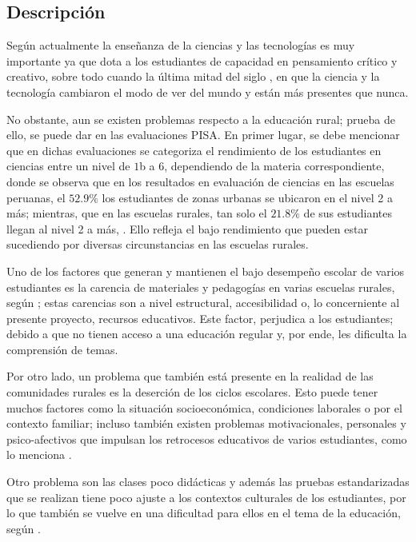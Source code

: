\subsection{Descripción}

\setcounter{siglo}{20}

Según \cite[p.~140-143]{elaner_antonio_arrieta_vega_2024_13517936} actualmente la enseñanza de la ciencias y las tecnologías es muy importante ya que dota a los estudiantes de capacidad en pensamiento crítico y creativo, sobre todo cuando la última mitad del siglo , en que la ciencia y la tecnología cambiaron el modo de ver del mundo y están más presentes que nunca.

No obstante, aun se existen problemas respecto a la educación rural; prueba de ello, se puede dar en las evaluaciones PISA. En primer lugar, se debe mencionar que en dichas evaluaciones se categoriza el rendimiento de los estudiantes en ciencias entre un nivel de $1$b a $6$, dependiendo de la materia correspondiente, donde se observa que en los resultados en evaluación de ciencias en las escuelas peruanas, el $52.9\%$ los estudiantes de zonas urbanas se ubicaron en el nivel 2 a más; mientras, que en las escuelas rurales, tan solo el $21.8\%$ de sus estudiantes llegan al nivel 2 a más, \cite[p.~32]{umcPISA2022presentation}. Ello refleja el bajo rendimiento que pueden estar sucediendo por diversas circunstancias en las escuelas rurales.

Uno de los factores que generan y mantienen el bajo desempeño escolar de varios estudiantes es la carencia de materiales y pedagogías en varias escuelas rurales, según \cite[p.~136]{montes2023participacion}; estas carencias son a nivel estructural, accesibilidad o, lo concerniente al presente proyecto, recursos educativos. Este factor, perjudica a los estudiantes; debido a que no tienen acceso a una educación regular y, por ende, les dificulta la comprensión de temas.

Por otro lado, un problema que también está presente en la realidad de las comunidades rurales es la deserción de los ciclos escolares. Esto puede tener muchos factores como la situación socioeconómica, condiciones laborales o por el contexto familiar; incluso también existen problemas motivacionales, personales y psico-afectivos que impulsan los retrocesos educativos de varios estudiantes, como lo menciona \cite{Torres_Gonzalez_Acevedo_Correa_Gallo_Garcia_2016}.

Otro problema son las clases poco didácticas y además las pruebas estandarizadas que se realizan tiene poco ajuste a los contextos culturales de los estudiantes, por lo que también se vuelve en una dificultad para ellos en el tema de la educación, según \cite[p.~23]{elaner_antonio_arrieta_vega_2024_13517936}.

